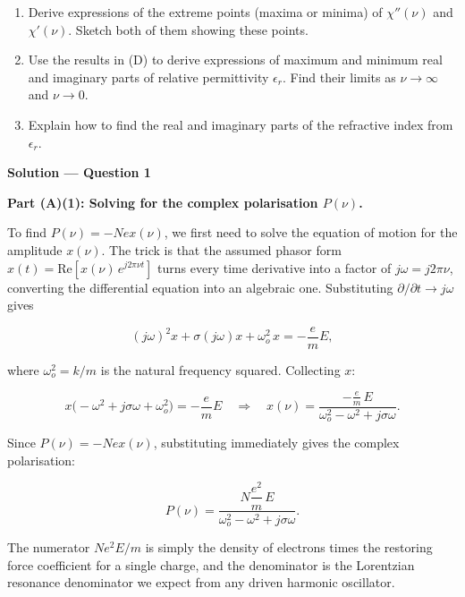 \begin{question}[Question 1]
\begin{enumerate}[label=(\Alph*)]
  \item Derive expressions of the extreme points (maxima or minima) of $\chi''(\nu)$ and
        $\chi'(\nu)$. Sketch both of them showing these points.

  \item Use the results in (D) to derive expressions of maximum and minimum real and imaginary
        parts of relative permittivity $\epsilon_{r}$. Find their limits as $\nu\to\infty$ and
        $\nu\to 0$.

  \item Explain how to find the real and imaginary parts of the refractive index from
        $\epsilon_{r}$.

\end{enumerate}
\end{question}

\textbf{\large Solution — Question 1}

\textbf{Part (A)(1): Solving for the complex polarisation $P(\nu)$.}

To find $P(\nu) = -Nex(\nu)$, we first need to solve the equation of motion for the amplitude $x(\nu)$. The trick is that the assumed phasor form $x(t) = \mathrm{Re}[x(\nu)\,e^{j2\pi\nu t}]$ turns every time derivative into a factor of $j\omega = j2\pi\nu$, converting the differential equation into an algebraic one. Substituting $\partial/\partial t \to j\omega$ gives

\begin{equation*}
  (j\omega)^2 x + \sigma(j\omega)x + \omega_o^2\,x = -\frac{e}{m}E,
\end{equation*}

where $\omega_o^2 = k/m$ is the natural frequency squared. Collecting $x$:

\begin{equation*}
  x\bigl(-\omega^2 + j\sigma\omega + \omega_o^2\bigr) = -\frac{e}{m}E
  \quad\Longrightarrow\quad
  x(\nu) = \frac{-\tfrac{e}{m}\,E}{\omega_o^2 - \omega^2 + j\sigma\omega}.
\end{equation*}

Since $P(\nu) = -Nex(\nu)$, substituting immediately gives the complex polarisation:

\begin{equation*}
  \boxed{P(\nu) = \frac{N\dfrac{e^2}{m}\,E}{\omega_o^2 - \omega^2 + j\sigma\omega}.}
\end{equation*}

The numerator $Ne^2E/m$ is simply the density of electrons times the restoring force coefficient for a single charge, and the denominator is the Lorentzian resonance denominator we expect from any driven harmonic oscillator.

